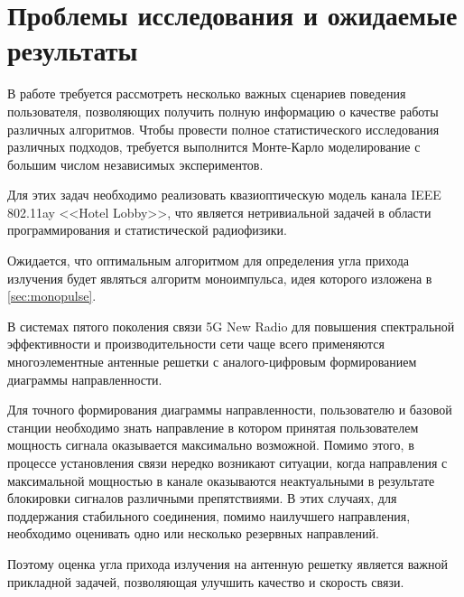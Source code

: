 \documentclass{statphysicsdep}
\begin{document}

\section{Проблемы исследования и ожидаемые результаты}

В работе требуется рассмотреть несколько важных сценариев поведения пользователя, 
позволяющих получить полную информацию о качестве работы различных алгоритмов.
Чтобы провести полное статистического исследования различных подходов, требуется
выполнится Монте-Карло моделирование с большим числом независимых
экспериментов.  

Для этих задач необходимо реализовать квазиоптическую модель канала 
IEEE 802.11ay <<Hotel Lobby>>, что является нетривиальной задачей в области 
программирования и статистической радиофизики. 

Ожидается, что оптимальным алгоритмом для определения угла прихода излучения будет 
являться алгоритм моноимпульса, идея которого изложена в \ref{sec:monopulse}.

\Conclusion


В системах пятого поколения связи 5G New Radio
для повышения спектральной
эффективности и производительности  сети чаще всего
применяются многоэлементные
антенные решетки с аналого-цифровым формированием
диаграммы направленности.

Для точного формирования диаграммы направленности, пользователю и базовой
станции необходимо знать направление в котором принятая пользователем мощность
сигнала оказывается максимально возможной.  Помимо этого, в процессе
установления связи нередко возникают ситуации, когда направления с максимальной
мощностью в канале оказываются неактуальными в результате блокировки сигналов
различными препятствиями. В этих случаях, для поддержания стабильного
соединения, помимо наилучшего направления, необходимо оценивать одно или
несколько резервных направлений.

Поэтому оценка угла прихода излучения на антенную решетку является важной
прикладной задачей, позволяющая улучшить качество и скорость связи.



{\footnotesize
\printbibliography
}
\end{document}
